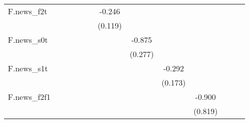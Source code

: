 {\begin{tabular}{l*{12}{c}}
\addlinespace
F.news\_f2t  &                     &                     &                     &                     &                     &      -0.246\sym{**} &                     &                     &                     &                     &                     &                     \\
            &                     &                     &                     &                     &                     &     (0.119)         &                     &                     &                     &                     &                     &                     \\
\addlinespace
F.news\_s0t  &                     &                     &                     &                     &                     &                     &      -0.875\sym{***}&                     &                     &                     &                     &                     \\
            &                     &                     &                     &                     &                     &                     &     (0.277)         &                     &                     &                     &                     &                     \\
\addlinespace
F.news\_s1t  &                     &                     &                     &                     &                     &                     &                     &      -0.292\sym{*}  &                     &                     &                     &                     \\
            &                     &                     &                     &                     &                     &                     &                     &     (0.173)         &                     &                     &                     &                     \\
\addlinespace
F.news\_f2f1 &                     &                     &                     &                     &                     &                     &                     &                     &      -0.900         &                     &                     &                     \\
            &                     &                     &                     &                     &                     &                     &                     &                     &     (0.819)         &                     &                     &                     \\

\end{tabular}}
